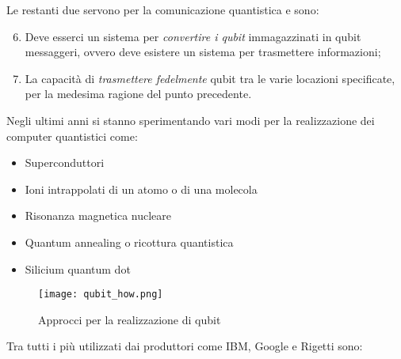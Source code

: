 Le restanti due servono per la comunicazione quantistica e sono:

\begin{enumerate}
  \setcounter{enumi}{5}
  \item Deve esserci un sistema per \textit{convertire i qubit} immagazzinati in qubit messaggeri, ovvero deve esistere un sistema per trasmettere informazioni;
  \item La capacità di \textit{trasmettere fedelmente} qubit tra le varie locazioni specificate, per la medesima ragione del punto precedente.
\end{enumerate}

Negli ultimi anni si stanno sperimentando vari modi per la realizzazione dei computer quantistici come:
\begin{itemize}
  \item Superconduttori
  \item Ioni intrappolati di un atomo o di una molecola
  \item Risonanza magnetica nucleare
  \item Quantum annealing o ricottura quantistica
  \item Silicium quantum dot
\end{itemize}

\begin{figure}[htbp]
  \centering
  \texttt{[image: qubit\_how.png]}
  \caption{Approcci per la realizzazione di qubit}
  \label{fig:qubit_how}
\end{figure}

Tra tutti i più utilizzati dai produttori come IBM, Google e Rigetti sono:

